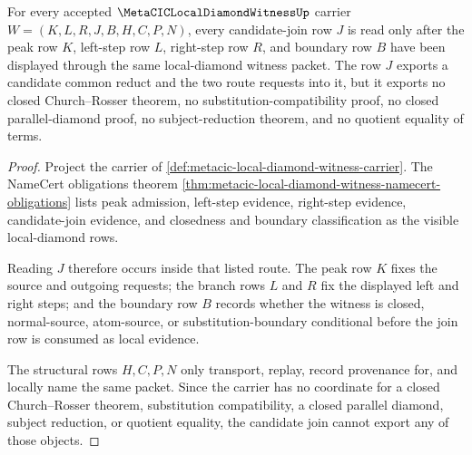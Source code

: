 \begin{theorem}
\label{thm:metacic-local-diamond-witness-candidate-join-exactness}
For every accepted $\MetaCICLocalDiamondWitnessUp$ carrier $W=(K,L,R,J,B,H,C,P,N)$, every candidate-join row $J$ is read only after the peak row $K$, left-step row $L$, right-step row $R$, and boundary row $B$ have been displayed through the same local-diamond witness packet. The row $J$ exports a candidate common reduct and the two route requests into it, but it exports no closed Church--Rosser theorem, no substitution-compatibility proof, no closed parallel-diamond proof, no subject-reduction theorem, and no quotient equality of terms.
\end{theorem}
\begin{proof}
Project the carrier of \autoref{def:metacic-local-diamond-witness-carrier}. The NameCert obligations theorem \autoref{thm:metacic-local-diamond-witness-namecert-obligations} lists peak admission, left-step evidence, right-step evidence, candidate-join evidence, and closedness and boundary classification as the visible local-diamond rows.

Reading $J$ therefore occurs inside that listed route. The peak row $K$ fixes the source and outgoing requests; the branch rows $L$ and $R$ fix the displayed left and right steps; and the boundary row $B$ records whether the witness is closed, normal-source, atom-source, or substitution-boundary conditional before the join row is consumed as local evidence.

The structural rows $H,C,P,N$ only transport, replay, record provenance for, and locally name the same packet. Since the carrier has no coordinate for a closed Church--Rosser theorem, substitution compatibility, a closed parallel diamond, subject reduction, or quotient equality, the candidate join cannot export any of those objects.
\end{proof}

